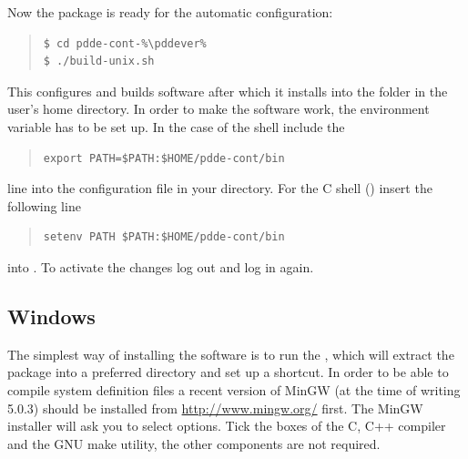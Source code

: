 \documentclass[10pt,a4paper]{ddedoc}
\begin{document}
Now the package is ready for the automatic configuration:
{ \small \begin{quote} \begin{lstlisting}[basicstyle=\tt,frame=single]
$ cd pdde-cont-%\pddever%
$ ./build-unix.sh
\end{lstlisting} \end{quote} } \noindent
This configures and builds software after which it installs into the
 folder in the user's home directory.
In order to make the software work, the  environment variable has
to be set up. In the case of the  shell include the
{ \small \begin{quote} \begin{lstlisting}[basicstyle=\tt,frame=single]
export PATH=$PATH:$HOME/pdde-cont/bin
\end{lstlisting} \end{quote} } \noindent
line into the  configuration file in your 
directory. For the C shell () insert the following line
{ \small \begin{quote} \begin{lstlisting}[basicstyle=\tt,frame=single]
setenv PATH $PATH:$HOME/pdde-cont/bin
\end{lstlisting} \end{quote} } \noindent
into . To activate the changes log out and log in again.

\subsection{Windows}

The simplest way of installing the software is to run the
, which will extract the package into a
preferred directory and set up a  shortcut. In order to be
able to compile system definition files a recent version of MinGW (at the time
of writing 5.0.3) should be installed from \url{http://www.mingw.org/} first.
The MinGW installer will ask you to select options. Tick the boxes of the C, C++
compiler and the GNU make utility, the other components are not required.
\end{document}
